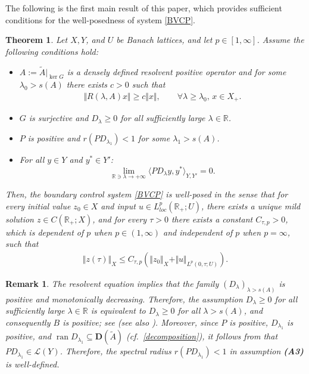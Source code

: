 \documentclass[onecolumn]{autart}
\def\R{{\mathbb{R}}}
\def\R{\mathbb R}
\newtheorem{theorem}{Theorem}[section]  %
\newtheorem{remark}{Remark}[section]
\numberwithin{equation}{section}
\begin{document}
    The following is the first main result of this paper, which provides sufficient conditions for the well-posedness of system \eqref{BVCP}.
	\begin{theorem}\label{Main1}
		Let $X,Y$, and $U$ be Banach lattices, and let $p \in [1,\infty]$.
		Assume the following conditions hold:
		\begin{itemize}
			\item[\bf{(A1)}] $A := \tilde{A}\vert_{\ker G}$ is a densely defined resolvent positive operator and for some $\lambda_0 > s(A)$ there exists $c > 0$ such that
			\begin{align}\label{inverse2}
				\Vert R(\lambda, A)x \Vert \geq c \Vert x \Vert, \qquad \forall \lambda \ge \lambda_0, \, x \in {X_+}.
			\end{align}
			\item[\bf{(A2)}] $G$ is surjective and $D_{\lambda} \ge 0$  {for all sufficiently large $\lambda\in \R$}.
			\item[\bf{(A3)}] $P$ is positive and $r(P D_{\lambda_1}) < 1$ for some $\lambda_1 > s(A)$.
			\item[\bf{(A4)}] For all $y \in Y$ and $y^* \in Y'$:
			$$\lim_{\R \ni \lambda \to +\infty} \langle P D_\lambda y, y^* \rangle_{Y,Y'} = 0.$$
		\end{itemize}
		Then, the  boundary control system \eqref{BVCP} is well-posed in the sense that for every initial value $z_0 \in X$ and input $u \in L^p_{loc}(\R_+;U)$, there exists a unique mild solution $z \in {C}(\R_+; X)$, and for every $\tau > 0$ there exists a constant $C_{\tau,p} > 0$, which is dependent of $p$ when $p\in(1,\infty)$ and  independent of $p$ when $p=\infty$, such that
		\begin{align*}
			\Vert z(\tau) \Vert_X  \le C_{\tau,p} \left( \Vert z_0 \Vert_X  + \Vert u \Vert_{L^p(0,\tau;U)}   \right).
		\end{align*}
	\end{theorem}
	
	\begin{remark}\label{Remark-on-well-posedness}
	 The resolvent equation implies that the family $(D_\lambda)_{\lambda>s(A)}$ is positive and monotonically decreasing. Therefore, the assumption ${D_\lambda \ge 0}$  {for all sufficiently large $\lambda\in \R$} is equivalent to $D_\lambda \ge 0$ for all $\lambda > s(A)$, and consequently $B$ is positive;  see \cite[Prop. 4.3]{SGPS} (see also \cite[Rem. 2.2]{BJVW}). Moreover, since $P$ is positive, $D_{\lambda_1}$ is positive, and $\operatorname{ran} D_{\lambda_1} \subseteq \bm{D}(\tilde{A})$ (cf.~\eqref{decomposition}), it follows from \cite[Thm.~II.5.3]{Schaf} that $P D_{\lambda_1} \in \mathcal{L}(Y)$. Therefore, the spectral radius $r(P D_{\lambda_1}) < 1$ in assumption {\bf (A3)} is well-defined.

	\end{remark}
	
\end{document}
